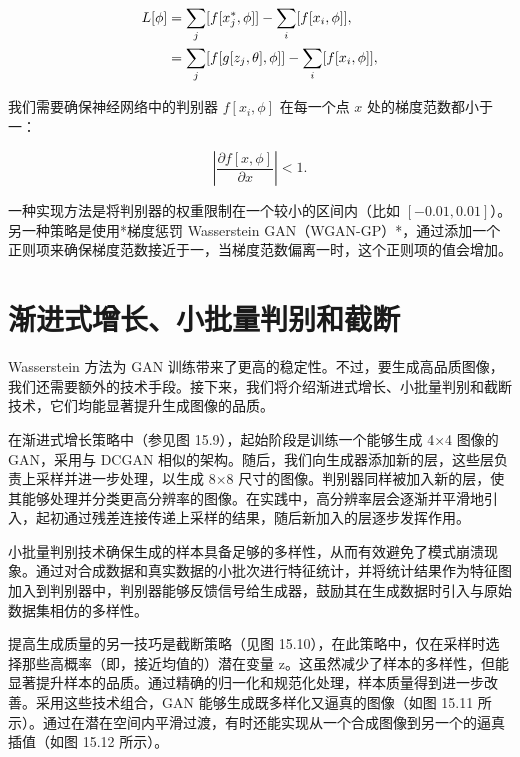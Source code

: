 \documentclass[lang=cn,newtx,10pt,scheme=chinese]{elegantbook}
\begin{document}
\begin{align}
L[\phi] &= \sum_j [f[x_j^*, \phi]] - \sum_i [f[x_i, \phi]], \notag \\
&= \sum_j [f[g[z_j, \theta], \phi]] - \sum_i [f[x_i, \phi]], 
\end{align} 


我们需要确保神经网络中的判别器 \(f[x_i, \phi]\) 在每一个点 \(x\) 处的梯度范数都小于一：

\begin{equation}
\left| \frac{\partial f[x, \phi]}{\partial x} \right| < 1. 
\end{equation}

一种实现方法是将判别器的权重限制在一个较小的区间内（比如 \([-0.01, 0.01]\)）。另一种策略是使用*梯度惩罚 Wasserstein GAN（WGAN-GP）*，通过添加一个正则项来确保梯度范数接近于一，当梯度范数偏离一时，这个正则项的值会增加。

\section{渐进式增长、小批量判别和截断}
Wasserstein 方法为 GAN 训练带来了更高的稳定性。不过，要生成高品质图像，我们还需要额外的技术手段。接下来，我们将介绍渐进式增长、小批量判别和截断技术，它们均能显著提升生成图像的品质。

在渐进式增长策略中（参见图 15.9），起始阶段是训练一个能够生成 4×4 图像的 GAN，采用与 DCGAN 相似的架构。随后，我们向生成器添加新的层，这些层负责上采样并进一步处理，以生成 8×8 尺寸的图像。判别器同样被加入新的层，使其能够处理并分类更高分辨率的图像。在实践中，高分辨率层会逐渐并平滑地引入，起初通过残差连接传递上采样的结果，随后新加入的层逐步发挥作用。

小批量判别技术确保生成的样本具备足够的多样性，从而有效避免了模式崩溃现象。通过对合成数据和真实数据的小批次进行特征统计，并将统计结果作为特征图加入到判别器中，判别器能够反馈信号给生成器，鼓励其在生成数据时引入与原始数据集相仿的多样性。

提高生成质量的另一技巧是截断策略（见图 15.10），在此策略中，仅在采样时选择那些高概率（即，接近均值的）潜在变量 z。这虽然减少了样本的多样性，但能显著提升样本的品质。通过精确的归一化和规范化处理，样本质量得到进一步改善。采用这些技术组合，GAN 能够生成既多样化又逼真的图像（如图 15.11 所示）。通过在潜在空间内平滑过渡，有时还能实现从一个合成图像到另一个的逼真插值（如图 15.12 所示）。
\end{document}
